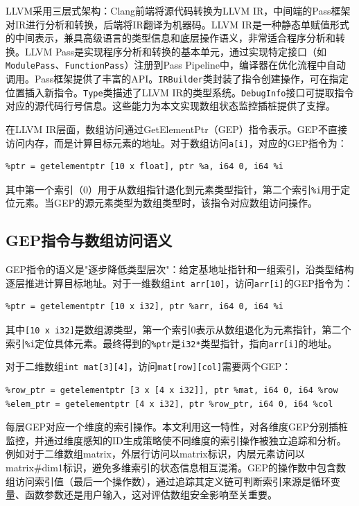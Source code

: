 \documentclass[bachelor]{njupthesis}
\begin{document}
LLVM采用三层式架构：Clang前端将源代码转换为LLVM IR，中间端的Pass框架对IR进行分析和转换，后端将IR翻译为机器码\cite{LLVMiris}。LLVM IR是一种静态单赋值形式的中间表示，兼具高级语言的类型信息和底层操作语义，非常适合程序分析和转换。LLVM Pass是实现程序分析和转换的基本单元，通过实现特定接口（如\texttt{ModulePass}、\texttt{FunctionPass}）注册到Pass Pipeline中，编译器在优化流程中自动调用。Pass框架提供了丰富的API。\texttt{IRBuilder}类封装了指令创建操作，可在指定位置插入新指令。\texttt{Type}类描述了LLVM IR的类型系统。\texttt{DebugInfo}接口可提取指令对应的源代码行号信息。这些能力为本文实现数组状态监控插桩提供了支撑。

在LLVM IR层面，数组访问通过GetElementPtr（GEP）指令表示。GEP不直接访问内存，而是计算目标元素的地址。对于数组访问\texttt{a[i]}，对应的GEP指令为：

\begin{verbatim}
%ptr = getelementptr [10 x float], ptr %a, i64 0, i64 %i
\end{verbatim}

其中第一个索引（0）用于从数组指针退化到元素类型指针，第二个索引\texttt{\%i}用于定位元素。当GEP的源元素类型为数组类型时，该指令对应数组访问操作。

\subsection{GEP指令与数组访问语义}

GEP指令的语义是"逐步降低类型层次"：给定基地址指针和一组索引，沿类型结构逐层推进计算目标地址。对于一维数组\texttt{int arr[10]}，访问\texttt{arr[i]}的GEP指令为：

\begin{verbatim}
%ptr = getelementptr [10 x i32], ptr %arr, i64 0, i64 %i
\end{verbatim}

其中\texttt{[10 x i32]}是数组源类型，第一个索引0表示从数组退化为元素指针，第二个索引\texttt{\%i}定位具体元素。最终得到的\texttt{\%ptr}是\texttt{i32*}类型指针，指向\texttt{arr[i]}的地址。

对于二维数组\texttt{int mat[3][4]}，访问\texttt{mat[row][col]}需要两个GEP：

\begin{verbatim}
%row_ptr = getelementptr [3 x [4 x i32]], ptr %mat, i64 0, i64 %row
%elem_ptr = getelementptr [4 x i32], ptr %row_ptr, i64 0, i64 %col
\end{verbatim}

每层GEP对应一个维度的索引操作。本文利用这一特性，对各维度GEP分别插桩监控，并通过维度感知的ID生成策略使不同维度的索引操作被独立追踪和分析。例如对于二维数组matrix，外层行访问以matrix标识，内层元素访问以matrix\#dim1标识，避免多维索引的状态信息相互混淆。GEP的操作数中包含数组访问索引值（最后一个操作数），通过追踪其定义链可判断索引来源是循环变量、函数参数还是用户输入，这对评估数组安全影响至关重要。
\end{document}
